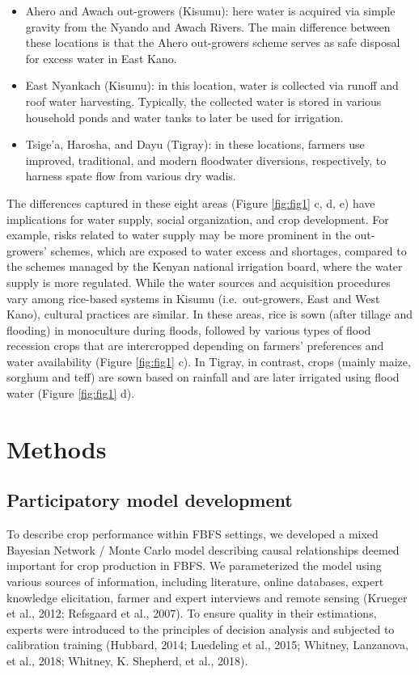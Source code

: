 \documentclass[]{elsarticle} %
\begin{document}
\begin{itemize}
\item
  Ahero and Awach out-growers (Kisumu): here water is acquired via simple gravity from the Nyando and Awach Rivers. The main difference between these locations is that the Ahero out-growers scheme serves as safe disposal for excess water in East Kano.
\item
  East Nyankach (Kisumu): in this location, water is collected via runoff and roof water harvesting. Typically, the collected water is stored in various household ponds and water tanks to later be used for irrigation.
\item
  Tsige'a, Harosha, and Dayu (Tigray): in these locations, farmers use improved, traditional, and modern floodwater diversions, respectively, to harness spate flow from various dry wadis.
\end{itemize}

The differences captured in these eight areas (Figure \ref{fig:fig1} c, d, e) have implications for water supply, social organization, and crop development. For example, risks related to water supply may be more prominent in the out-growers' schemes, which are exposed to water excess and shortages, compared to the schemes managed by the Kenyan national irrigation board, where the water supply is more regulated. While the water sources and acquisition procedures vary among rice-based systems in Kisumu (i.e.~out-growers, East and West Kano), cultural practices are similar. In these areas, rice is sown (after tillage and flooding) in monoculture during floods, followed by various types of flood recession crops that are intercropped depending on farmers' preferences and water availability (Figure \ref{fig:fig1} c). In Tigray, in contrast, crops (mainly maize, sorghum and teff) are sown based on rainfall and are later irrigated using flood water (Figure \ref{fig:fig1} d).

\hypertarget{ref3}{%
\section{Methods}\label{ref3}}

\hypertarget{ref31}{%
\subsection{Participatory model development}\label{ref31}}

To describe crop performance within FBFS settings, we developed a mixed Bayesian Network / Monte Carlo model describing causal relationships deemed important for crop production in FBFS. We parameterized the model using various sources of information, including literature, online databases, expert knowledge elicitation, farmer and expert interviews and remote sensing (Krueger et al., 2012; Refsgaard et al., 2007). To ensure quality in their estimations, experts were introduced to the principles of decision analysis and subjected to calibration training (Hubbard, 2014; Luedeling et al., 2015; Whitney, Lanzanova, et al., 2018; Whitney, K. Shepherd, et al., 2018).
\end{document}
